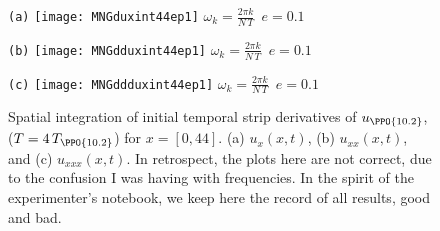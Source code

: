 \begin{description}
\begin{figure}[ht]
  \begin{minipage}[height=.40\textheight]{.32\textwidth}
    \centering \small{\texttt{(a)}}
    \texttt{[image: MNGduxint44ep1]}
    \small{\texttt{$\omega_k = \frac{2 \pi k}{N\,T}$ $e=0.1$}}
  \end{minipage}
  \begin{minipage}[height=.40\textheight]{.32\textwidth}
    \centering \small{\texttt{(b)}}
    \texttt{[image: MNGdduxint44ep1]}
    \small{\texttt{$\omega_k = \frac{2 \pi k}{N\,T}$ $e=0.1$}}
  \end{minipage}
  \begin{minipage}[height=.25\textheight]{.32\textwidth}
    \centering \small{\texttt{(c)}}
    \texttt{[image: MNGddduxint44ep1]}
    \small{\texttt{$\omega_k = \frac{2 \pi k}{N\,T}$ $e=0.1$}}
  \end{minipage}
   \caption{
  Spatial integration of initial temporal strip derivatives of
  $u_{\PPO{10.2}}$, ($T=4\,T_{\PPO{10.2}}$) for $x = [0,44]$.
  (a) $u_{x}(x,t)$, (b) $u_{xx}(x,t)$, and (c) $u_{xxx}(x,t)$.
  In retrospect, the plots here are not correct, due to the confusion I
  was having with frequencies. In the spirit of the experimenter's
  notebook, we keep here the record of all results, good and bad.
  }
  \label{fig:MNGxint44deriv}
\end{figure}



\end{description}
